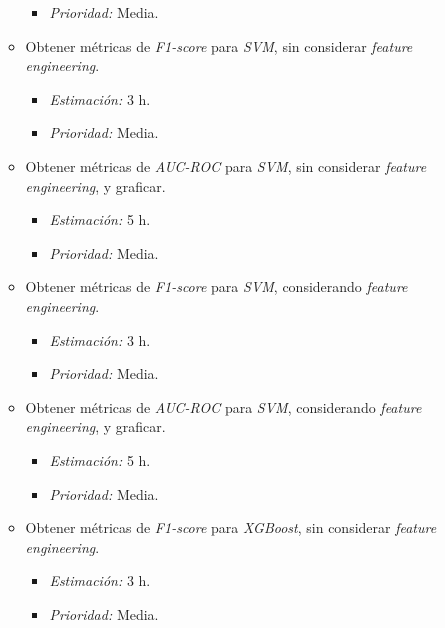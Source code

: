 \documentclass[
11pt, %
]{charter}
\begin{document}
\begin{itemize}
\begin{itemize}
\begin{itemize}
                    \item \textit{Prioridad:} Media.
                \end{itemize}                
            \item Obtener métricas de \textit{F1-score} para \textit{SVM}, sin  considerar \textit{feature engineering}.
                \begin{itemize}
                    \item \textit{Estimación:} 3 h.
                    \item \textit{Prioridad:} Media.
                \end{itemize}
            \item Obtener métricas de \textit{AUC-ROC} para \textit{SVM}, sin  considerar \textit{feature engineering}, y graficar.
                \begin{itemize}
                    \item \textit{Estimación:} 5 h.
                    \item \textit{Prioridad:} Media.
                \end{itemize}
            \item Obtener métricas de \textit{F1-score} para \textit{SVM}, considerando \textit{feature engineering}.
                \begin{itemize}
                    \item \textit{Estimación:} 3 h.
                    \item \textit{Prioridad:} Media.
                \end{itemize}
            \item Obtener métricas de \textit{AUC-ROC} para \textit{SVM}, considerando \textit{feature engineering}, y graficar.
                \begin{itemize}
                    \item \textit{Estimación:} 5 h.
                    \item \textit{Prioridad:} Media.
                \end{itemize}                
            \item Obtener métricas de \textit{F1-score} para \textit{XGBoost}, sin  considerar \textit{feature engineering}.
                \begin{itemize}
                    \item \textit{Estimación:} 3 h.
                    \item \textit{Prioridad:} Media.
                \end{itemize}

\end{itemize}
\end{itemize}
\end{document}
